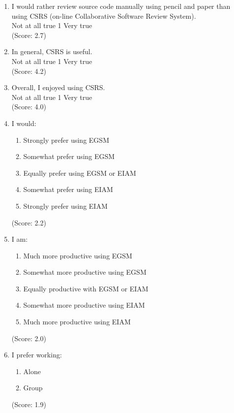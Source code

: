 \begin{enumerate}

\item  I would rather review source code manually using pencil and paper than
using CSRS (on-line Collaborative Software Review System).
\\
Not at all true \hfill 1     \hfill Very true\\
(Score: 2.7)

\item  In general, CSRS is useful.
\\
Not at all true \hfill 1     \hfill Very true\\
(Score: 4.2)

\item  Overall, I enjoyed using CSRS.
\\
Not at all true \hfill 1    
\hfill Very true\\
(Score: 4.0)

\item I would:
    \begin{enumerate}
   \item[(1)]Strongly prefer using EGSM
   \item[(2)]Somewhat prefer using EGSM
   \item[(3)]Equally prefer using EGSM or EIAM
   \item[(4)]Somewhat prefer using EIAM
   \item[(5)]Strongly prefer using EIAM
   \end{enumerate}
(Score: 2.2)

\item I am:
    \begin{enumerate}
     \item[(1)] Much more productive using EGSM
     \item[(2)] Somewhat more productive using EGSM
     \item[(3)] Equally productive with EGSM or EIAM
     \item[(4)] Somewhat more productive using EIAM
     \item[(5)] Much more productive using EIAM
     \end{enumerate}   
(Score: 2.0)

\item  I prefer working:
   \begin{enumerate}
     \item[(1)] Alone 
     \item[(2)] Group
   \end{enumerate} 
(Score: 1.9)


\end{enumerate}
